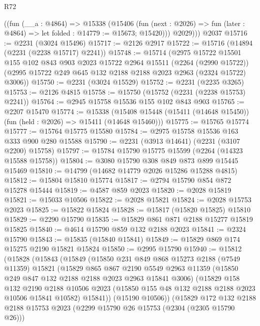 \begin{lexlean}{R72}
\begin{coremodule}
        ((fun (__a : @4864) =>
        @15338
          (@15406
            (fun (next : @2026) => fun (later : @4864) => let folded : @14779 := @15673; @15420)))
          @2029)))
    @2037
@15716 := @2231 (@3024 @15496)
@15717 := @2126 @2917
@15722 := @15716 (@14894 (@2231 (@2238 @15717) @2241))
@15748 := @15714
    (@2975
      @15722
      @15501
      @155
      @102
      @843
      @903
      @2023
      @15722
      @2964
      @15511
      (@2264 (@2990 @15722))
      (@2995 @15722 @249 @645 @132 @2188 @2188 @2023 @2963 (@2324 @15722) @3006))
@15750 := @2231 (@3024 @15529)
@15752 := @2231 (@2235 @3265)
@15753 := @2126 @4815
@15758 := @15750 (@15752 (@2231 (@2238 @15753) @2241))
@15764 := @2945 @15758 @15536 @155 @102 @843 @903
@15765 := @2207 @15470
@15774 := @15338
    (@15408 @15448 (@15411 (@14648 @15450)) (fun (held : @2026) => @15411 (@14648 @15460)))
@15775 := @15765 @15774
@15777 := @15764 @15775 @15580
@15784 := @2975 @15758 @15536 @163 @333 @900 @280 @15588
@15790 := @2231 (@3913 @14641) (@2231 (@3107 @2200) @15758)
@15797 := @15784 @15790 @15775 @15599 (@2264 (@14323 @15588 @15758))
@15804 := @3080 @15790 @308 @849 @873 @899 @15445 @15469
@15810 := @14799 (@14682 @14779 @2026 @15286 @15288 @4815)
@15812 := @15804 @15810 @15774
@15817 := @2794 @15790 @854 @872 @15278 @15444
@15819 := @4587 @859 @2023
@15820 := @2028 @15819
@15821 := @15033 @10506
@15822 := @2028 @15821
@15824 := @2028 @15753 @2023
@15825 := @15822 @15824
@15828 := @15817 (@15820 @15825) @15810
@15829 := @2290 @15790
@15835 := @15829 @861 @871 @2188 @15277 @15819 @15825
@15840 := @4614 @15790 @859 @132 @2188 @2023
@15841 := @2324 @15790
@15843 := @15835 (@15840 @15841)
@15849 := @15829 @869 @174 @15275 @2190 @15821 @15824
@15850 := @2995 @15790
@15940 := @15812
    (@15828
      (@15843
        (@15849
          (@15850
            @231
            @849
            @868
            @15273
            @2188
            (@7549 @11359)
            @15821
            (@15829
              @865
              @867
              @2190
              @5549
              @2963
              @11359
              (@15850 @249 @847 @132 @2188 @2188 @2023 @2963 @15841 @3006)
              (@15829
                @158
                @132
                @2190
                @2188
                @10506
                @2023
                (@15850 @155 @48 @132 @2188 @2188 @2023 @10506 @15841 @10582)
                @15841))
            (@15190 @10506))
          (@15829
            @172
            @132
            @2188
            @2188
            @15753
            @2023
            (@2299 @15790 @26 @15753 (@2304 (@2305 @15790 @26)))

\end{coremodule}
\end{lexlean}
